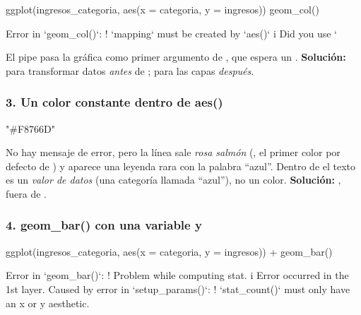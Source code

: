 \begin{rnoejecutar}
ggplot(ingresos_categoria, aes(x = categoria, y = ingresos)) %
  geom_col()
\end{rnoejecutar}
\begin{rsalida}
Error in `geom_col()`:
! `mapping` must be created by `aes()`
i Did you use `%
\end{rsalida}

El pipe pasa la gráfica como primer argumento de , que
espera un . \textbf{Solución:} \codigo{\%>\%} para
transformar datos \emph{antes} de ; \codigo{+} para las
capas \emph{después}.

\subsubsection{3. Un color constante dentro de aes()}

\begin{rsalida}
[1] "#F8766D"
\end{rsalida}

No hay mensaje de error, pero la línea sale \emph{rosa salmón}
(, el primer color por defecto de ) y
aparece una leyenda rara con la palabra ``azul''. Dentro de 
el texto  es un \emph{valor de datos} (una categoría llamada
``azul''), no un color. \textbf{Solución:}
, fuera de .

\subsubsection{4. geom\_bar() con una variable y}

\begin{rnoejecutar}
ggplot(ingresos_categoria, aes(x = categoria, y = ingresos)) +
  geom_bar()
\end{rnoejecutar}
\begin{rsalida}
Error in `geom_bar()`:
! Problem while computing stat.
i Error occurred in the 1st layer.
Caused by error in `setup_params()`:
! `stat_count()` must only have an x or y aesthetic.
\end{rsalida}

